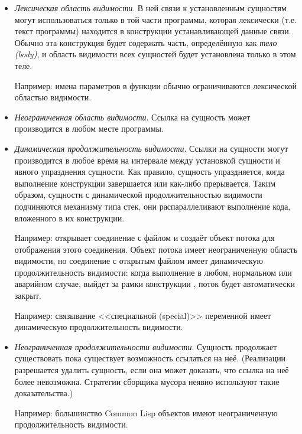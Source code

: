 \begin{itemize}

\item 
\emph{Лексическая область видимости}. В ней связи к установленным сущностям могут
использоваться только в той части программы, которая лексически (т.е. текст
программы) находится в конструкции устанавливающей данные связи. Обычно эта
конструкция будет содержать часть, определённую как \emph{тело (body)}, и область
видимости всех сущностей будет установлена только в этом теле.

Например: имена параметров в функции обычно ограничиваются лексической областью
видимости.

\item
\emph{Неограниченная область видимости}. Ссылка на сущность может производится в
любом месте программы.

\item
\emph{Динамическая продолжительность видимости}. Ссылки на сущности могут
производится в любое время на интервале между установкой сущности и явного
упразднения сущности. Как правило, сущность упраздняется, когда выполнение конструкции
завершается или как-либо прерывается. Таким образом, сущности с динамической
продолжительностью видимости подчиняются механизму типа стек, они распараллеливают
выполнение кода, вложенного в их конструкции.

Например:  открывает соединение с файлом и создаёт объект
потока для отображения этого соединения. Объект потока имеет неограниченную область
видимости, но соединение с открытым файлом имеет динамическую продолжительность
видимости: когда выполнение в любом, нормальном или аварийном случае, выйдет за
рамки конструкции , поток будет автоматически закрыт.

Например: связывание <<специальной (special)>> переменной имеет динамическую
продолжительность видимости.

\item
\emph{Неограниченная продолжительности видимости}. Сущность продолжает существовать
пока существует возможность ссылаться на неё. (Реализации разрешается удалить
сущность, если она может доказать, что ссылка на неё более невозможна. Стратегии
сборщика мусора неявно используют такие доказательства.)

Например: большинство Common Lisp объектов имеют неограниченную продолжительность
видимости.


\end{itemize}
